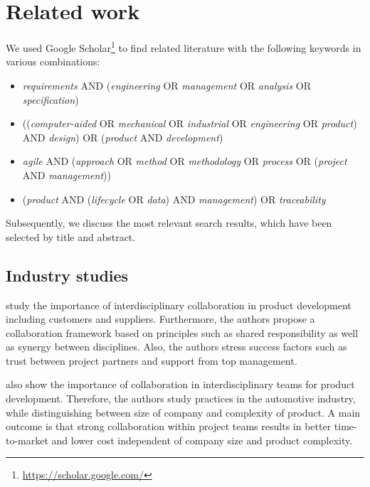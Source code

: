 \section{Related work}
\label{sec:differentiation}

We used Google Scholar\footnote{\url{https://scholar.google.com/}} to find related literature with the following keywords in various combinations:

\begin{itemize}
    \item \textit{requirements} AND (\textit{engineering} OR \textit{management} OR \textit{analysis} OR \textit{specification})
    \item ((\textit{computer-aided} OR \textit{mechanical} OR \textit{industrial} OR \textit{engineering} OR \textit{product}) AND \textit{design}) OR (\textit{product} AND \textit{development})
    \item \textit{agile} AND (\textit{approach} OR \textit{method} OR \textit{methodology} OR \textit{process} OR (\textit{project} AND \textit{management}))
    \item (\textit{product} AND (\textit{lifecycle} OR \textit{data}) AND \textit{management}) OR \textit{traceability}
\end{itemize}

Subsequently, we discuss the most relevant search results, which have been selected by title and abstract.

\subsection{Industry studies}

\cite{Jassawalla} study the importance of interdisciplinary collaboration in product development including customers and suppliers.
Furthermore, the authors propose a collaboration framework based on principles such as shared responsibility as well as synergy between disciplines.
Also, the authors stress success factors such as trust between project partners and support from top management.

\cite{sanchez2003flexibility} also show the importance of collaboration in interdisciplinary teams for product development.
Therefore, the authors study practices in the automotive industry, while distinguishing between size of company and complexity of product.
A main outcome is that strong collaboration within project teams results in better time-to-market and lower cost independent of company size and product complexity.

